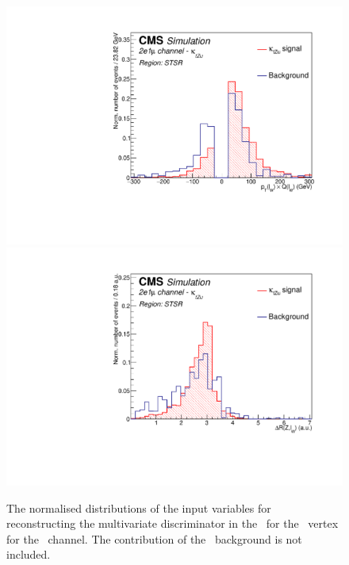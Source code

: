\begin{figure}[htbp]
	\includegraphics[width=0.3\linewidth]{6_Search/Figures/PlotsTechnics/ptWQZutsingletopeeu_norm}
	\includegraphics[width=0.3\linewidth]{6_Search/Figures/PlotsTechnics/dRZWlepZutsingletopeeu_norm}
	\caption{The normalised distributions of the input variables for reconstructing the multivariate discriminator in the \STSR\ for the \Zut\ vertex for the \eemu\ channel. The contribution of the \NPL\ background is not included. }
	\label{fig:singletopZutnormalizedeeu}
\end{figure}

